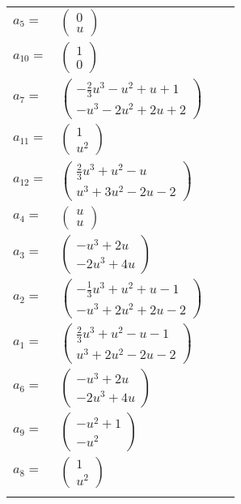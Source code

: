 \documentclass[1p]{elsarticle_modified}
\theoremstyle{definition}
\begin{document}
\begin{tabular}{m{7pt} m{180pt} m{7pt} m{180pt} }
\flushright $a_{5}=$&$\begin{pmatrix}0\\u\end{pmatrix}$ \\
\flushright $a_{10}=$&$\begin{pmatrix}1\\0\end{pmatrix}$ \\
\flushright $a_{7}=$&$\begin{pmatrix}-\frac{2}{3} u^3- u^2+u+1\\- u^3-2 u^2+2 u+2\end{pmatrix}$ \\
\flushright $a_{11}=$&$\begin{pmatrix}1\\u^2\end{pmatrix}$ \\
\flushright $a_{12}=$&$\begin{pmatrix}\frac{2}{3} u^3+u^2- u\\u^3+3 u^2-2 u-2\end{pmatrix}$ \\
\flushright $a_{4}=$&$\begin{pmatrix}u\\u\end{pmatrix}$ \\
\flushright $a_{3}=$&$\begin{pmatrix}- u^3+2 u\\-2 u^3+4 u\end{pmatrix}$ \\
\flushright $a_{2}=$&$\begin{pmatrix}-\frac{1}{3} u^3+u^2+u-1\\- u^3+2 u^2+2 u-2\end{pmatrix}$ \\
\flushright $a_{1}=$&$\begin{pmatrix}\frac{2}{3} u^3+u^2- u-1\\u^3+2 u^2-2 u-2\end{pmatrix}$ \\
\flushright $a_{6}=$&$\begin{pmatrix}- u^3+2 u\\-2 u^3+4 u\end{pmatrix}$ \\
\flushright $a_{9}=$&$\begin{pmatrix}- u^2+1\\- u^2\end{pmatrix}$ \\
\flushright $a_{8}=$&$\begin{pmatrix}1\\u^2\end{pmatrix}$\\&\end{tabular}
\end{document}
